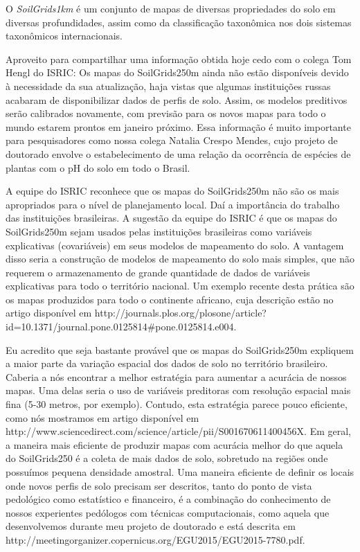 O \textit{SoilGrids1km} é um conjunto de mapas de diversas propriedades do solo em diversas profundidades, assim como da classificação taxonômica nos dois sistemas taxonômicos internacionais.

Aproveito para compartilhar uma informação obtida hoje cedo com o colega Tom Hengl do ISRIC: Os mapas do SoilGrids250m ainda não estão disponíveis devido à necessidade da sua atualização, haja vistas que algumas instituições russas acabaram de disponibilizar dados de perfis de solo. Assim, os modelos preditivos serão calibrados novamente, com previsão para os novos mapas para todo o mundo estarem prontos em janeiro próximo. Essa informação é muito importante para pesquisadores como nossa colega Natalia Crespo Mendes, cujo projeto de doutorado envolve o estabelecimento de uma relação da ocorrência de espécies de plantas com o pH do solo em todo o Brasil.

A equipe do ISRIC reconhece que os mapas do SoilGrids250m não são os mais apropriados para o nível de planejamento local. Daí a importância do trabalho das instituições brasileiras. A sugestão da equipe do ISRIC é que os mapas do SoilGrids250m sejam usados pelas instituições brasileiras como variáveis explicativas (covariáveis) em seus modelos de mapeamento do solo. A vantagem disso seria a construção de modelos de mapeamento do solo mais simples, que não requerem o armazenamento de grande quantidade de dados de variáveis explicativas para todo o território nacional. Um exemplo recente desta prática são os mapas produzidos para todo o continente africano, cuja descrição estão no artigo disponível em http://journals.plos.org/plosone/article?id=10.1371/journal.pone.0125814#pone.0125814.e004.

Eu acredito que seja bastante provável que os mapas do SoilGrids250m expliquem a maior parte da variação espacial dos dados de solo no território brasileiro. Caberia a nós encontrar a melhor estratégia para aumentar a acurácia de nossos mapas. Uma delas seria o uso de variáveis preditoras com resolução espacial mais fina (5-30 metros, por exemplo). Contudo, esta estratégia parece pouco eficiente, como nós mostramos em artigo disponível em http://www.sciencedirect.com/science/article/pii/S001670611400456X. Em geral, a maneira mais eficiente de produzir mapas com acurácia melhor do que aquela do SoilGrids250 é a coleta de mais dados de solo, sobretudo na regiões onde possuímos pequena densidade amostral. Uma maneira eficiente de definir os locais onde novos perfis de solo precisam ser descritos, tanto do ponto de vista pedológico como estatístico e financeiro, é a combinação do conhecimento de nossos experientes pedólogos com técnicas computacionais, como aquela que desenvolvemos durante meu projeto de doutorado e está descrita em http://meetingorganizer.copernicus.org/EGU2015/EGU2015-7780.pdf.